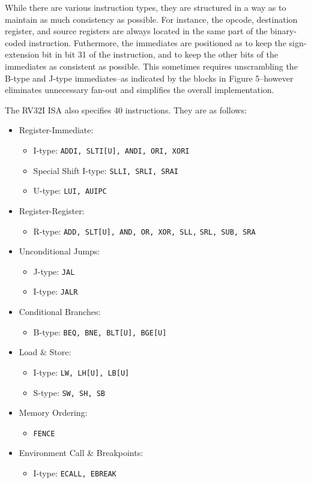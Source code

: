 \documentclass[lettersize,journal]{IEEEtran}
\begin{document}
While there are various instruction types, they are structured in a way as to maintain as much consistency as possible.
For instance, the opcode, destination register, and source registers are always located in the same part of the binary-coded instruction.
Futhermore, the immediates are positioned as to keep the sign-extension bit in bit 31 of the instruction, and to keep the other bits of the immediates as consistent as possible.
This sometimes requires unscrambling the B-type and J-type immediates--as indicated by the blocks in Figure 5--however eliminates unnecessary fan-out \cite{riscvunprovisioned} and simplifies the overall implementation.

The RV32I ISA also specifies 40 instructions.
They are as follows:
\begin{itemize}
  \item Register-Immediate:
  \begin{itemize}
    \item I-type: \verb|ADDI, SLTI[U], ANDI, ORI, XORI|
    \item Special Shift I-type: \verb|SLLI, SRLI, SRAI|
    \item U-type: \verb|LUI, AUIPC|
  \end{itemize}
  \item Register-Register:
  \begin{itemize}
    \item R-type: \verb|ADD, SLT[U], AND, OR, XOR, SLL,|
     \verb|SRL, SUB, SRA|
  \end{itemize}
  \item Unconditional Jumps:
  \begin{itemize}
    \item J-type: \verb|JAL|
    \item I-type: \verb|JALR|
  \end{itemize}
  \item Conditional Branches:
  \begin{itemize}
    \item B-type: \verb|BEQ, BNE, BLT[U], BGE[U]|
  \end{itemize}
  \item Load \& Store:
  \begin{itemize}
    \item I-type: \verb|LW, LH[U], LB[U]|
    \item S-type: \verb|SW, SH, SB|
  \end{itemize}
  \item Memory Ordering:
  \begin{itemize}
    \item \verb|FENCE|
  \end{itemize}
  \item Environment Call \& Breakpoints:
  \begin{itemize}
    \item I-type: \verb|ECALL, EBREAK|
  \end{itemize}
\end{itemize}
\end{document}
